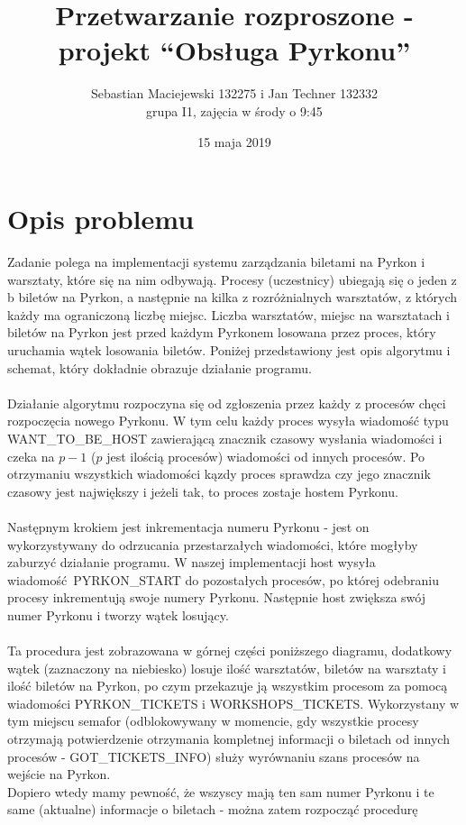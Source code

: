 \documentclass[10pt,a4paper]{article}
\author{Sebastian Maciejewski 132275 i Jan Techner 132332\\
grupa I1, zajęcia w środy o 9:45}
\title{Przetwarzanie rozproszone - projekt “Obsługa Pyrkonu”}
\date{15 maja 2019}
\begin{document}
\maketitle
\section{Opis problemu}
Zadanie polega na implementacji systemu zarządzania biletami na Pyrkon i warsztaty, które się na nim odbywają. 
Procesy (uczestnicy) ubiegają się o jeden z b biletów na Pyrkon, a następnie na kilka z rozróżnialnych warsztatów, 
z których każdy ma ograniczoną liczbę miejsc. Liczba warsztatów, miejsc na warsztatach i biletów na Pyrkon jest
przed każdym Pyrkonem losowana przez proces, który uruchamia wątek losowania biletów.
Poniżej przedstawiony jest opis algorytmu i schemat, który dokładnie obrazuje działanie programu.\\
\\
Działanie algorytmu rozpoczyna się od zgłoszenia przez każdy z procesów chęci rozpoczęcia nowego Pyrkonu.
W tym celu każdy proces wysyła wiadomość typu WANT\_TO\_BE\_HOST zawierającą znacznik czasowy wysłania wiadomości 
i czeka na $p-1$ ($p$ jest ilością procesów) wiadomości od innych procesów. Po otrzymaniu wszystkich wiadomości 
kązdy proces sprawdza czy jego znacznik czasowy jest największy i jeżeli tak, to proces zostaje hostem Pyrkonu.\\
\\
Następnym krokiem jest inkrementacja numeru Pyrkonu - jest on wykorzystywany do odrzucania przestarzałych wiadomości, które mogłyby zaburzyć działanie programu.
W naszej implementacji host wysyła wiadomość PYRKON\_START do pozostałych procesów,
po której odebraniu procesy inkrementują swoje numery Pyrkonu. Następnie host zwiększa swój numer Pyrkonu i tworzy wątek losujący.\\
\\
Ta procedura jest zobrazowana w górnej części poniższego diagramu, dodatkowy wątek (zaznaczony na niebiesko)
losuje ilość warsztatów, biletów na warsztaty i ilość biletów na Pyrkon, po czym przekazuje ją
wszystkim procesom za pomocą wiadomości PYRKON\_TICKETS i WORKSHOPS\_TICKETS. Wykorzystany w tym miejscu semafor (odblokowywany w momencie, gdy wszystkie procesy otrzymają
potwierdzenie otrzymania kompletnej informacji o biletach od innych procesów - GOT\_TICKETS\_INFO) służy wyrównaniu szans procesów na wejście na Pyrkon.\\
Dopiero wtedy mamy pewność, że wszyscy mają ten
sam numer Pyrkonu i te same (aktualne) informacje o biletach - można zatem rozpocząć procedurę 
\end{document}
